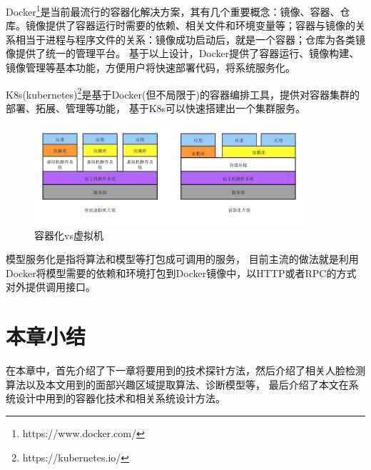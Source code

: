 Docker\footnote{https://www.docker.com/}是当前最流行的容器化解决方案，其有几个重要概念：镜像、容器、仓库。镜像提供了容器运行时需要的依赖、相关文件和环境变量等；容器与镜像的关系相当于进程与程序文件的关系：镜像成功启动后，就是一个容器；仓库为各类镜像提供了统一的管理平台。
基于以上设计，Docker提供了容器运行、镜像构建、镜像管理等基本功能，方便用户将快速部署代码，将系统服务化。

K8s(kubernetes)\footnote{https://kubernetes.io/}是基于Docker(但不局限于)的容器编排工具，提供对容器集群的部署、拓展、管理等功能，
基于K8s可以快速搭建出一个集群服务。

\begin{figure}
    \centering
    \includegraphics[width=10cm]{images/container.png}
    \caption{容器化vs虚拟机}
    \label{fig:container}
\end{figure}

模型服务化是指将算法和模型等打包成可调用的服务，
目前主流的做法就是利用Docker将模型需要的依赖和环境打包到Docker镜像中，以HTTP或者RPC的方式对外提供调用接口。

\section{本章小结}
在本章中，首先介绍了下一章将要用到的技术探针方法，然后介绍了相关人脸检测算法以及本文用到的面部兴趣区域提取算法、诊断模型等，
最后介绍了本文在系统设计中用到的容器化技术和相关系统设计方法。